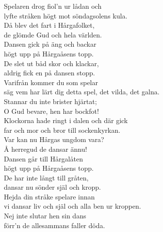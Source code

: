 \documentclass[a6paper, 10pt, twoside]{article}
\begin{document}
\noindent
\begin{center}
\end{center}
\begin{lyrics}
Spelaren drog fiol'n ur lådan och\\
lyfte stråken högt mot söndagsolens kula.\\
Då blev det fart i Hårgafolket,\\
de glömde Gud och hela världen.
\vspace{5pt}\\
Dansen gick på äng och backar\\
högt upp på Hårgaåsens topp.\\
De slet ut båd skor och klackar,\\
aldrig fick en på dansen stopp.
\vspace{5pt}\\
Varifrån kommer du som spelar\\
säg vem har lärt dig detta spel, det vilda, det galna.\\
Stannar du inte brister hjärtat;\\
O Gud bevare, hen har bockfot!
\vspace{5pt}\\
Klockorna hade ringt i dalen och där gick\\
far och mor och bror till sockenkyrkan.\\
Var kan nu Hårgas ungdom vara?\\
Å herregud de dansar ännu!
\vspace{5pt}\\
Dansen går till Hårgalåten\\
högt upp på Hårgaåsens topp.\\
De har inte långt till gråten,\\
dansar nu sönder själ och kropp.
\vspace{5pt}\\
Hejda din stråke spelare innan \\
vi dansar liv och själ och alla ben ur kroppen.\\
Nej inte slutar hen sin dans \\
förr'n de allesammans faller döda.
\end{lyrics}
\end{document}
